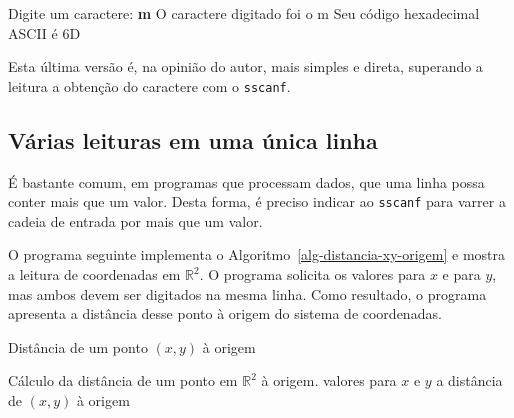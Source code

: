 \documentclass[
  11pt,
  a4paper,
]{scrbook}
\newenvironment{Shaded}{\begin{snugshade}}{\end{snugshade}}
\newcommand{\KeywordTok}[1]{\textcolor[rgb]{0.13,0.29,0.53}{\textbf{#1}}}
\newcommand{\NormalTok}[1]{#1}
\begin{document}
\begin{Shaded}
\begin{Highlighting}[]
\NormalTok{Digite um caractere: }\KeywordTok{ m }
\NormalTok{O caractere digitado foi o m}
\NormalTok{Seu código hexadecimal ASCII é 6D}
\end{Highlighting}
\end{Shaded}

Esta última versão é, na opinião do autor, mais simples e direta,
superando a leitura a obtenção do caractere com o \texttt{sscanf}.

\subsection{Várias leituras em uma única
linha}\label{vuxe1rias-leituras-em-uma-uxfanica-linha}

É bastante comum, em programas que processam dados, que uma linha possa
conter mais que um valor. Desta forma, é preciso indicar ao
\texttt{sscanf} para varrer a cadeia de entrada por mais que um valor.

O programa seguinte implementa o Algoritmo~\ref{alg-distancia-xy-origem}
e mostra a leitura de coordenadas em \(\mathbb{R}^2\). O programa
solicita os valores para \(x\) e para \(y\), mas ambos devem ser
digitados na mesma linha. Como resultado, o programa apresenta a
distância desse ponto à origem do sistema de coordenadas.

\begin{algorithm}
\caption{\label{alg-distancia-xy-origem}Distância de um ponto \((x, y)\)
à origem}
\begingroup%


\begin{algorithmic}
    \Description Cálculo da distância de um ponto em $\mathbb{R}^2$ à origem.
    \Require valores para $x$ e $y$
    \Ensure a distância de $(x, y)$ à origem
    \Statex{}
\end{algorithmic}

\endgroup
\end{algorithm}
\end{document}
